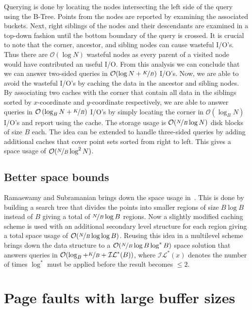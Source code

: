 \documentclass[twoside,11pt,openright]{report}
\begin{document}
Querying is done by locating the nodes intersecting the left side of the query using the B-Tree. Points from the nodes are reported by examining the associated buckets. Next, right siblings of the nodes and their descendants are examined in a top-down fashion until the bottom boundary of the query is crossed. It is crucial to note that the corner, ancestor, and sibling nodes can cause wasteful I/O's. Thus there are $\mathcal{O}(\log N)$ wasteful nodes as every parent of a visited node would have contributed an useful I/O. From this analysis we can conclude that we can answer two-sided queries in $\mathcal{O}(\log N + \nicefrac{K}{B})$ I/O's. Now, we are able to avoid the wasteful I/O's by caching the data in the ancestor and sibling nodes. By associating two caches with the corner that contain all data in the siblings sorted by $x$-coordinate and $y$-coordinate respectively, we are able to answer queries in $\mathcal{O}\left(\log_B N + \nicefrac{K}{B}\right)$ I/O's by simply locating the corner in $\mathcal{O}(\log_B N)$ I/O's and report using the cache. The storage usage is $\mathcal{O}(\nicefrac{N}{B} \log N)$ disk blocks of size $B$ each. The idea can be extended to handle three-sided queries by adding additional caches that cover point sets sorted from right to left. This gives a space usage of $\mathcal{O}(\nicefrac{N}{B} \log^2 N)$. 

\section{Better space bounds}
\label{sec:ramaswamy_better_space}

Ramaswamy and Subramanian brings down the space usage in~\cite{Subramanian:1995:PTN:313651.313769}. This is done by building a search tree that divides the points into smaller regions of size $B \log B$ instead of $B$ giving a total of $\nicefrac{N}{B} \log B$ regions. Now a slightly modified caching scheme is used with an additional secondary level structure for each region giving a total space usage of $\mathcal{O}(\nicefrac{N}{B} \log \log B)$. Reusing this idea in a multilevel scheme brings down the data structure to a $\mathcal{O}(\nicefrac{N}{B} \log B \log^* B)$ space solution that answers queries in $\mathcal{O}(\log_B + \nicefrac{K}{B} + \mathcal{IL}^*(B))$, where $\mathcal{IL^*}(x)$ denotes the number of times $\log^*$ must be applied before the result becomes $\leq 2$.


\chapter{Page faults with large buffer sizes}
\label{app:page_faults_for_large_buffer_size}
\end{document}
